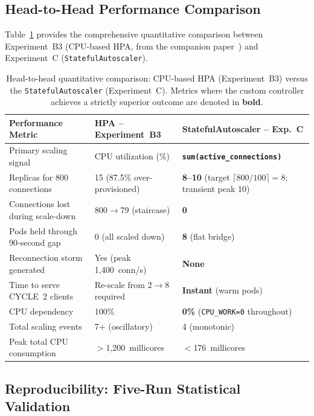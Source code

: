 \documentclass[twocolumn]{svjour3}
\begin{document}
\subsection{Head-to-Head Performance Comparison}

Table~\ref{tab:head_to_head} provides the comprehensive quantitative comparison between
Experiment~B3 (CPU-based HPA, from the companion paper~\cite{behera2026hpa}) and
Experiment~C (\texttt{StatefulAutoscaler}).

\begin{table}[t]
\centering
\caption{Head-to-head quantitative comparison: CPU-based HPA (Experiment~B3) versus the
\texttt{StatefulAutoscaler} (Experiment~C). Metrics where the custom controller achieves a
strictly superior outcome are denoted in \textbf{bold}.}
\label{tab:head_to_head}
\begin{tabular}{@{}p{4.5cm}p{4.5cm}p{4.5cm}@{}}
\toprule
\rowcolor{gray!12}
\textbf{Performance Metric} & \textbf{HPA -- Experiment~B3} & \textbf{StatefulAutoscaler -- Exp.~C} \\
\midrule
Primary scaling signal & CPU utilization (\%) & \textbf{\texttt{sum(active\_connections)}} \\
Replicas for 800 connections & 15 (87.5\% over-provisioned) & \textbf{8--10} (target $\lceil800/100\rceil=8$; transient peak 10) \\
Connections lost during scale-down & 800$\rightarrow$79 (staircase) & \textbf{0} \\
Pods held through 90-second gap & 0 (all scaled down) & \textbf{8} (flat bridge) \\
Reconnection storm generated & Yes (peak 1,400~conn/s) & \textbf{None} \\
Time to serve CYCLE~2 clients & Re-scale from 2$\rightarrow$8 required & \textbf{Instant} (warm pods) \\
CPU dependency & 100\% & \textbf{0\%} (\texttt{CPU\_WORK=0} throughout) \\
Total scaling events & 7+ (oscillatory) & 4 (monotonic) \\
Peak total CPU consumption & $>$1,200~millicores & $<$176~millicores \\
\bottomrule
\end{tabular}
\end{table}

\subsection{Reproducibility: Five-Run Statistical Validation}
\label{sec:exp_c_multi}
\end{document}
